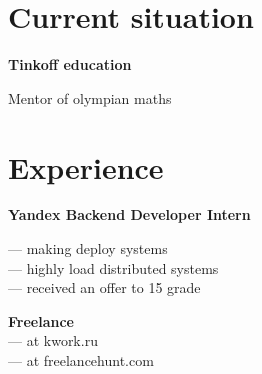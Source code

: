\documentclass[a4paper,10pt]{article}
\begin{document}
%
\hfill
\begin{adjustbox}{valign=t}
\begin{minipage}{0.05\textwidth} %
\MyVerticalRule  %
\end{minipage}
\end{adjustbox}
\hfill
%
\begin{adjustbox}{valign=t}
\begin{minipage}{0.6\textwidth} %
\section*{Current situation}
\begin{description}
\raggedright
\item[\normalfont \textcolor{ColorOne}{October. 2020 -- Dec. 2021.}] \textbf{Tinkoff education}\\ \medskip

Mentor of olympian maths

\end{description}

\section*{Experience}
\begin{description}
\raggedright
\item[\normalfont \textcolor{ColorOne}{2021}] 
	\textbf{Yandex
Backend Developer Intern}\\ \medskip
	
	--- making deploy systems \\
	--- highly load distributed systems \\
	--- received an offer to 15 grade
	
\item[\normalfont \textcolor{ColorOne}{Aug. 2019 -- Aug. 2021.}] 
	\textbf{Freelance}\\ \medskip
	---  at kwork.ru \\
	---  at freelancehunt.com
	
\end{description}


\end{minipage}
\end{adjustbox}
\end{document}
